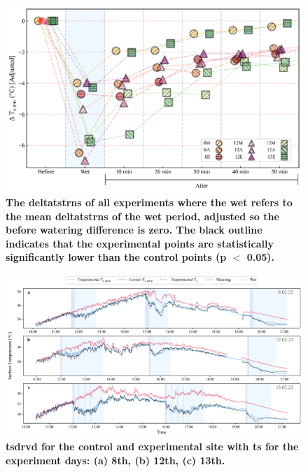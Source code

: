 \documentclass[final,3p,times,authoryear]{elsarticle}
\begin{document}
\begin{figure}
\centering
\includegraphics[trim={0 0 0 0},clip,scale=1.0]{pict045.png}
\caption{\bf The \gls{deltatstrns} of all experiments where the wet refers to the mean \gls{deltatstrns} of the wet period, adjusted so the before watering difference is zero. The black outline indicates that the experimental points are statistically significantly lower than the control points (\gls{p} $<$ 0.05).}
 \label{fig:7.16}
\end{figure}



\begin{figure}
\centering
\includegraphics[trim={0 0 0 0},clip,scale=1.0]{pict028.png}
\caption{\bf \gls{tsdrvd} for the control and experimental site with \gls{ts} for the experiment days: (a) 8th, (b) 12th, (c) 13th.}
 \label{fig:7.17}
\end{figure}
\end{document}
